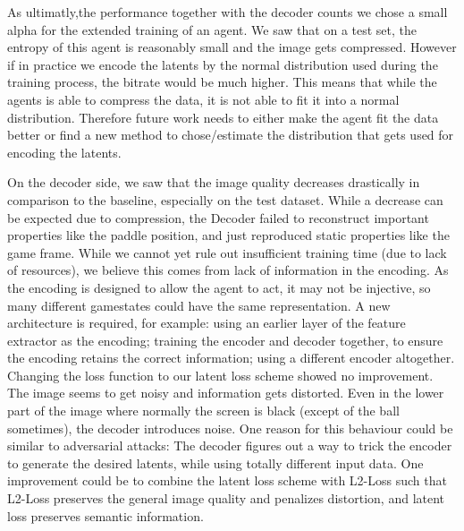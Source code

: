 As ultimatly,the performance together with the decoder counts we chose a small
alpha for the extended training of an agent. We saw that on a test set, the
entropy of this agent is reasonably small and the image gets compressed. However
if in practice we encode the latents by the normal distribution used during the
training process, the bitrate would be much higher. This means that while
the agents is able to compress the data, it is not able to fit it into a normal
distribution. Therefore future work needs to either make the agent fit the data
better or find a new method to chose/estimate the distribution that gets used
for encoding the latents. 

On the decoder side, we saw that the image quality decreases drastically in
comparison to the baseline, especially on the test dataset. While a decrease can
be expected due to compression, the Decoder failed to reconstruct important
properties like the paddle position, and just reproduced static properties like
the game frame. While we cannot yet rule out insufficient training time (due to
lack of resources), we believe this comes from lack of information in the
encoding. As the encoding is designed to allow the agent to act, it may not be
injective, so many different gamestates could have the same representation. A
new architecture is required, for example: using an earlier layer of the feature
extractor as the encoding; training the encoder and decoder together, to ensure
the encoding retains the correct information; using a different encoder
altogether.\\

Changing the loss function to our latent loss scheme showed no improvement. The
image seems to get noisy and information gets distorted. Even in the lower part
of the image where normally the screen is black (except of the ball sometimes),
the decoder introduces noise. One reason for this behaviour could be similar to
adversarial attacks: The decoder figures out a way to trick the encoder to
generate the desired latents, while using totally different input data. One
improvement could be to combine the latent loss scheme with L2-Loss such that
L2-Loss preserves the general image quality and penalizes distortion,
and latent loss preserves semantic information.


